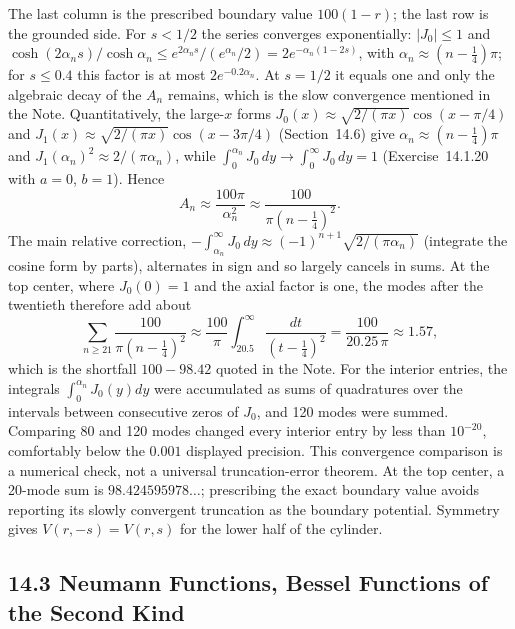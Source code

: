 The last column is the prescribed boundary value $100(1-r)$;
the last row is the grounded side. For $s<1/2$ the series converges
exponentially: $|J_0|\le1$ and
$\cosh(2\alpha_ns)/\cosh\alpha_n\le e^{2\alpha_ns}/(e^{\alpha_n}/2)
=2e^{-\alpha_n(1-2s)}$, with $\alpha_n\approx(n-\frac14)\pi$; for
$s\le0.4$ this factor is at most $2e^{-0.2\alpha_n}$. At $s=1/2$ it
equals one and only the algebraic decay of the $A_n$ remains, which
is the slow convergence mentioned in the Note. Quantitatively, the
large-$x$ forms $J_0(x)\approx\sqrt{2/(\pi x)}\cos(x-\pi/4)$ and
$J_1(x)\approx\sqrt{2/(\pi x)}\cos(x-3\pi/4)$ (Section~14.6) give
$\alpha_n\approx(n-\frac14)\pi$ and
$J_1(\alpha_n)^2\approx2/(\pi\alpha_n)$, while
$\int_0^{\alpha_n}J_0\,dy\to\int_0^\infty J_0\,dy=1$
(Exercise~14.1.20 with $a=0$, $b=1$). Hence
\[
A_n\approx\frac{100\pi}{\alpha_n^2}\approx\frac{100}{\pi(n-\frac14)^2}.
\]
The main relative correction,
$-\int_{\alpha_n}^\infty J_0\,dy\approx(-1)^{n+1}\sqrt{2/(\pi\alpha_n)}$
(integrate the cosine form by parts), alternates in sign and so
largely cancels in sums. At the top center, where $J_0(0)=1$ and the
axial factor is one, the modes after the twentieth therefore add about
\[
\sum_{n\ge21}\frac{100}{\pi(n-\frac14)^2}
\approx\frac{100}{\pi}\int_{20.5}^\infty\frac{dt}{(t-\frac14)^2}
=\frac{100}{20.25\,\pi}\approx1.57,
\]
which is the shortfall $100-98.42$ quoted in the Note. For the interior
entries, the integrals $\int_0^{\alpha_n}J_0(y)dy$ were accumulated
as sums of quadratures over the intervals between consecutive zeros
of $J_0$, and 120 modes were summed. Comparing 80 and 120 modes changed
every interior entry by less than $10^{-20}$, comfortably below
the $0.001$ displayed precision. This convergence comparison is a
numerical check, not a universal truncation-error theorem.
At the top center, a 20-mode sum is $98.424595978\ldots$; prescribing
the exact boundary value avoids reporting its slowly convergent
truncation as the boundary potential. Symmetry gives
$V(r,-s)=V(r,s)$ for the lower half of the cylinder.

\subsection*{14.3 Neumann Functions, Bessel Functions of the Second Kind}

